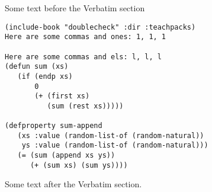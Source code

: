 \documentclass{article}
\begin{document}
Some text before the Verbatim section
\begin{Verbatim}
(include-book "doublecheck" :dir :teachpacks)
Here are some commas and ones: 1, 1, 1

Here are some commas and els: l, l, l
(defun sum (xs)
   (if (endp xs)
       0
       (+ (first xs)
          (sum (rest xs)))))

(defproperty sum-append
   (xs :value (random-list-of (random-natural))
    ys :value (random-list-of (random-natural)))
   (= (sum (append xs ys))
      (+ (sum xs) (sum ys))))
\end{Verbatim}
Some text after the Verbatim section.
\end{document}
